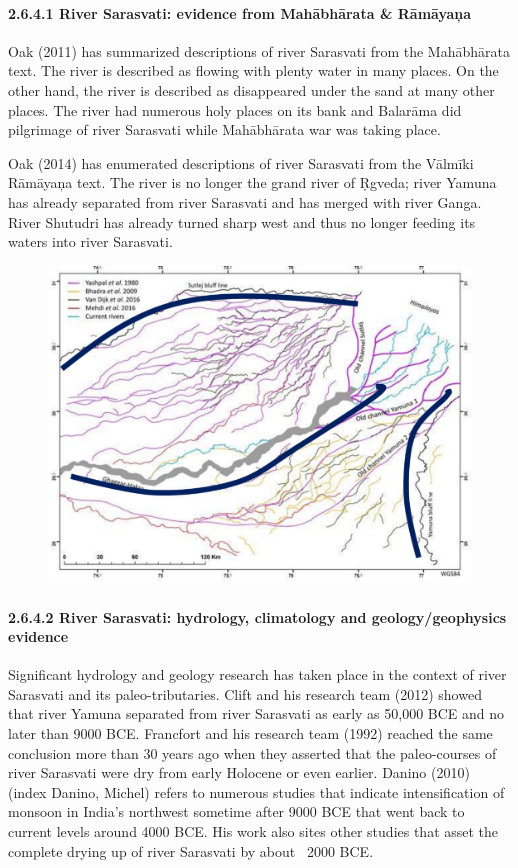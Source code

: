 \paragraph*{2.6.4.1 River Sarasvati: evidence from Mahābhārata \& Rāmāyaņa}

Oak (2011) has summarized descriptions of river Sarasvati from the Mahābhārata text. The river is described as flowing with plenty water in many places. On the other hand, the river is described as disappeared under the sand at many other places. The river had numerous holy places on its bank and Balarāma did pilgrimage of river Sarasvati while Mahābhārata war was taking place.

Oak (2014) has enumerated descriptions of river Sarasvati from the Vālmīki Rāmāyaņa text. The river is no longer the grand river of Ṛgveda; river Yamuna has already separated from river Sarasvati and has merged with river Ganga. River Shutudri has already turned sharp west and thus no longer feeding its waters into river Sarasvati.

\begin{figure}[!htbp]
\includegraphics[scale=0.23]{"images/8-20.jpg"}
\caption{}\label{art8-fig20}
\end{figure}


\paragraph*{2.6.4.2 River Sarasvati: hydrology, climatology and geology/\break geophysics evidence}

Significant hydrology and geology research has taken place in the context of river Sarasvati and its paleo-tributaries. Clift and his research team (2012) showed that river Yamuna separated from river Sarasvati as early as 50,000 BCE and no later than 9000 BCE. Francfort and his research team (1992) reached the same conclusion more than 30 years ago when they asserted that the paleo-courses of river Sarasvati were dry from early Holocene or even earlier. Danino (2010) (index Danino, Michel) refers to numerous studies that indicate intensification of monsoon in India’s northwest sometime after 9000 BCE that went back to current levels around 4000 BCE. His work also sites other studies that asset the complete drying up of river Sarasvati by about ~2000 BCE.

